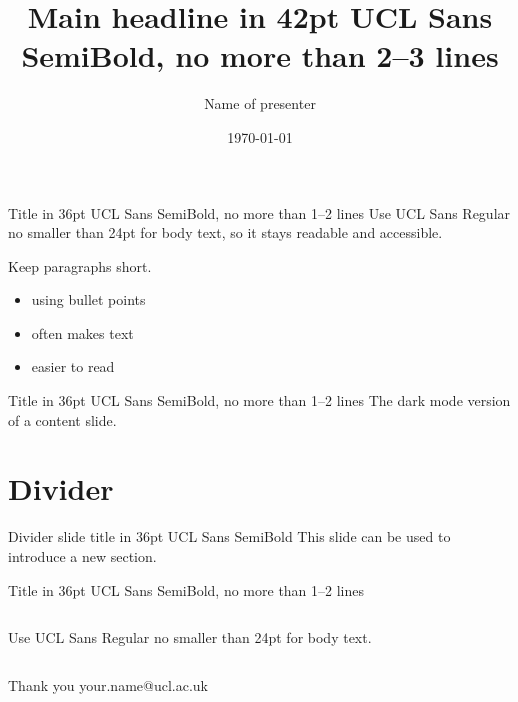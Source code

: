 \documentclass[aspectratio=169]{beamer}
\title{Main headline in 42pt UCL Sans SemiBold, no more than 2--3 lines}
\author{Name of presenter}
\institute{Faculty, department or unit}
\date{\today}
\begin{document}
\begin{frame}
  \titlepage
\end{frame}

\begin{frame}{Title in 36pt UCL Sans SemiBold, no more than 1--2 lines}
  Use UCL Sans Regular no smaller than 24pt for body text, so it stays
  readable and accessible.

  Keep paragraphs short.
  \begin{itemize}
    \item using bullet points
    \item often makes text
    \item easier to read
  \end{itemize}
\end{frame}

\begin{frame}[dark]{Title in 36pt UCL Sans SemiBold, no more than 1--2 lines}
  The dark mode version of a content slide.
\end{frame}

\section{Divider}
\begin{frame}[divider]{Divider slide title in 36pt UCL Sans SemiBold}
  This slide can be used to introduce a new section.
\end{frame}

\begin{frame}[stripe]{Title in 36pt UCL Sans SemiBold, no more than 1--2 lines}
  \begin{columns}[T]
      Use UCL Sans Regular no smaller than 24pt for body text.
  \end{columns}
\end{frame}

\begin{frame}[divider]{Thank you}
  your.name@ucl.ac.uk
\end{frame}
\end{document}
